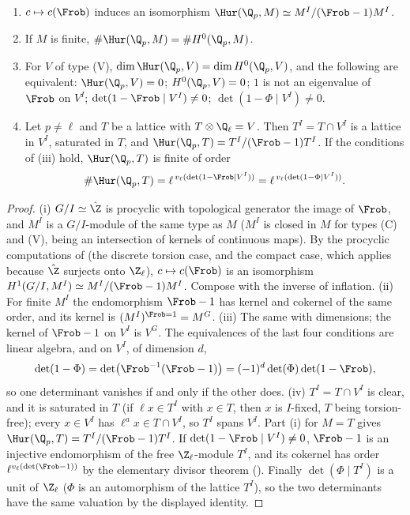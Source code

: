 \begin{proposition}\label{prop:galcoh:unramified-computed}
\begin{enumerate}[label=(\roman*)]
\item $c\mapsto c(\Frob)$ induces an isomorphism $\Hur(\Q_p,M)\simeq M^I/(\Frob-1)M^I$.
\item If $M$ is finite, $\#\Hur(\Q_p,M)=\#H^0(\Q_p,M)$.
\item For $V$ of type (V), $\dim\Hur(\Q_p,V)=\dim H^0(\Q_p,V)$, and the following are equivalent: $\Hur(\Q_p,V)=0$; $H^0(\Q_p,V)=0$; $1$ is not an eigenvalue of
$\Frob$ on $V^I$; $\det(1-\Frob\mid V^I)\ne0$; $\det(1-\Phi\mid V^I)\ne0$.
\item Let $p\ne\ell$ and $T$ be a lattice with $T\otimes\Q_\ell=V$. Then $T^I=T\cap V^I$ is a lattice in $V^I$, saturated in $T$, and $\Hur(\Q_p,T)=T^I/(\Frob-1)T^I$. If the
conditions of (iii) hold, $\Hur(\Q_p,T)$ is finite of order
\[
\#\Hur(\Q_p,T)=\ell^{\,v_\ell(\det(1-\Frob\mid V^I))}=\ell^{\,v_\ell(\det(1-\Phi\mid V^I))}.
\]
\end{enumerate}
\end{proposition}

\begin{proof}
(i) $G/I\simeq\hat\Z$ is procyclic with topological generator the image of $\Frob$, and $M^I$ is a $G/I$-module of the same type as $M$ ($M^I$ is closed in $M$ for types
(C) and (V), being an intersection of kernels of continuous maps). By the procyclic computations of  (the discrete torsion case, and the compact
case, which applies because $\hat\Z$ surjects onto $\Z_\ell$), $c\mapsto c(\Frob)$ is an isomorphism $H^1(G/I,M^I)\simeq M^I/(\Frob-1)M^I$. Compose with the inverse of
inflation. (ii) For finite $M^I$ the endomorphism $\Frob-1$ has kernel and cokernel of the same order, and its kernel is $(M^I)^{\Frob=1}=M^G$. (iii) The same with
dimensions; the kernel of $\Frob-1$ on $V^I$ is $V^G$. The equivalences of the last four conditions are linear algebra, and on $V^I$, of dimension $d$,
\[
\det(1-\Phi)=\det\bigl(\Frob^{-1}(\Frob-1)\bigr)=(-1)^d\det(\Phi)\det(1-\Frob),
\]
so one determinant vanishes if and only if the other does. (iv) $T^I=T\cap V^I$ is clear, and it is saturated in $T$ (if $\ell x\in T^I$ with $x\in T$, then $x$ is $I$-fixed, $T$
being torsion-free); every $x\in V^I$ has $\ell^ax\in T\cap V^I$, so $T^I$ spans $V^I$. Part (i) for $M=T$ gives $\Hur(\Q_p,T)=T^I/(\Frob-1)T^I$. If $\det(1-\Frob\mid V^I)\ne0$,
$\Frob-1$ is an injective endomorphism of the free $\Z_\ell$-module $T^I$, and its cokernel has order $\ell^{v_\ell(\det(\Frob-1))}$ by the elementary divisor theorem
(). Finally $\det(\Phi\mid T^I)$ is a unit of $\Z_\ell$ ($\Phi$ is an automorphism of the lattice $T^I$), so the two determinants have the same valuation by
the displayed identity.
\end{proof}

